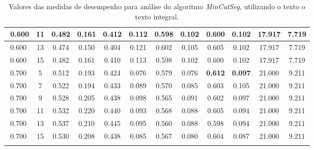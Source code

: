 \begin{longtable}[c]{|c|c|c|c|c|c|c|c|c|c|c|c|}
$$  0.600 & 11 & 0.482 & 0.161 & 0.412 & 0.112 & 0.598 & 0.102 & 0.600 & 0.102 & 17.917 & 7.719  \\ \hline 
  0.600 & 13 & 0.474 & 0.150 & 0.404 & 0.121 & 0.602 & 0.105 & 0.605 & 0.102 & 17.917 & 7.719  \\ \hline 
  0.600 & 15 & 0.482 & 0.161 & 0.410 & 0.113 & 0.598 & 0.102 & 0.600 & 0.102 & 17.917 & 7.719  \\ \hline 
  0.700 & 5 & 0.512 & 0.193 & 0.424 & 0.076 & 0.579 & 0.076 & \cellcolor{gray!20} \textbf{0.612} & \cellcolor{gray!20} \textbf{0.097} & 21.000 & 9.211  \\ \hline 
  0.700 & 7 & 0.522 & 0.194 & 0.433 & 0.089 & 0.570 & 0.085 & 0.603 & 0.105 & 21.000 & 9.211  \\ \hline 
  0.700 & 9 & 0.528 & 0.205 & 0.438 & 0.098 & 0.565 & 0.091 & 0.602 & 0.097 & 21.000 & 9.211  \\ \hline 
  0.700 & 11 & 0.532 & 0.220 & 0.440 & 0.093 & 0.568 & 0.088 & 0.605 & 0.094 & 21.000 & 9.211  \\ \hline 
  0.700 & 13 & 0.537 & 0.210 & 0.445 & 0.095 & 0.560 & 0.088 & 0.598 & 0.094 & 21.000 & 9.211  \\ \hline 
  0.700 & 15 & 0.530 & 0.208 & 0.438 & 0.085 & 0.567 & 0.080 & 0.604 & 0.087 & 21.000 & 9.211  \\ \hline 
 \caption{Valores das medidas de desempenho para análise do algoritmo \textit{MinCutSeg}, utilizando o texto o texto integral.}
 \end{longtable} 


